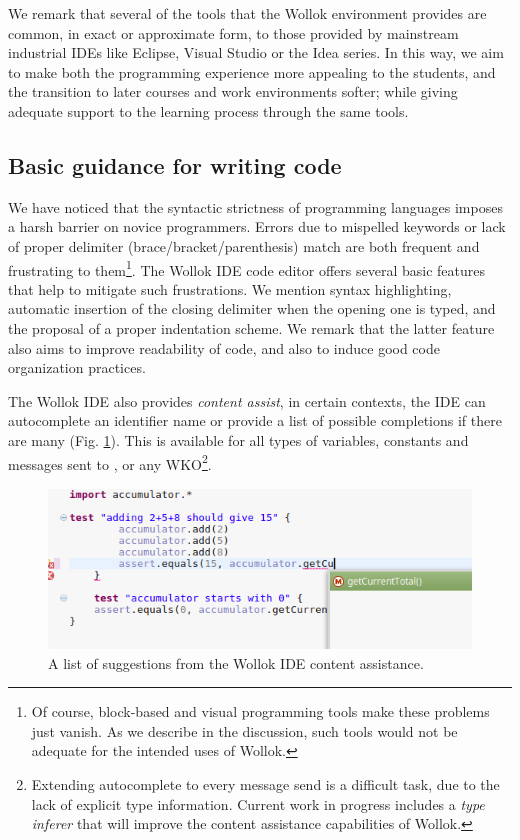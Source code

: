 	We remark that several of the tools that the Wollok environment provides are common, in exact or approximate form, to those provided by mainstream industrial IDEs like Eclipse, Visual Studio or the Idea series. In this way, we aim to make both the programming experience more appealing to the students, and the transition to later courses and work environments softer; while giving adequate support to the learning process through the same tools.



\subsection{Basic guidance for writing code}
We have noticed that the syntactic strictness of programming languages imposes a harsh barrier on novice programmers. 
Errors due to mispelled keywords or lack of proper delimiter (brace/bracket/parenthesis) match are both frequent and frustrating to them\footnote{Of course, block-based and visual programming tools make these problems just vanish. As we describe in the discussion, such tools would not be adequate for the intended uses of Wollok.}.
The Wollok IDE code editor offers several basic features that help to mitigate such frustrations. We mention syntax highlighting, automatic insertion of the closing delimiter when the opening one is typed, and the proposal of a proper indentation scheme. We remark that the latter feature also aims to improve readability of code, and also to induce good code organization practices.

The Wollok IDE also provides \emph{content assist}, 
\ie in certain contexts, the IDE can autocomplete an identifier name or provide a list of possible completions if there are many (\cf Fig. \ref{fig:codeCompletion}).
This is available for all types of variables, constants and messages sent to ,  or any WKO\footnote{Extending autocomplete to every message send is a difficult task, due to the lack of explicit type information. 
Current work in progress includes a \emph{type inferer} that will improve the content assistance capabilities of Wollok.}. 
 
\begin{figure}[ht]
 \centering
 \includegraphics[scale=0.45]{images/codeCompletion.png}
 \caption{\small A list of suggestions from the Wollok IDE content assistance.}
 \label{fig:codeCompletion}
\end{figure}

